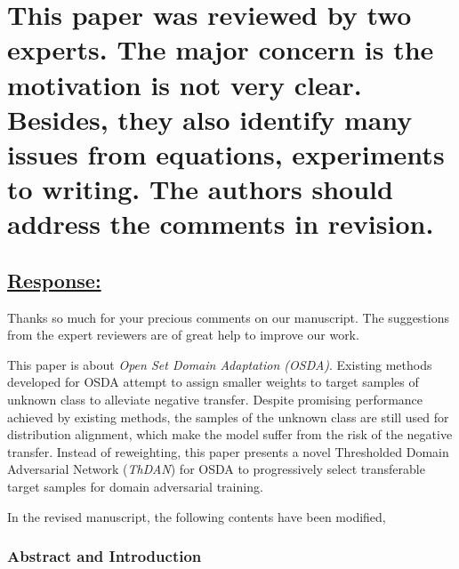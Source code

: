 \section*{This paper was reviewed by two experts.
    The major concern is the motivation is not very clear.
    Besides, they also identify many issues from equations, experiments to writing.
    The authors should address the comments in revision.
}
\subsection*{\underline{\textbf{Response:}}}

Thanks so much for your precious comments on our manuscript.
The suggestions from the expert reviewers are of great help to improve our work.

This paper is about \textit{Open Set Domain Adaptation (OSDA)}. 
Existing methods developed for OSDA attempt to assign smaller weights to target samples of unknown class to alleviate negative transfer.
Despite promising performance achieved by existing methods, the samples of the unknown class are still used for distribution alignment, which make the model suffer from the risk of the negative transfer. 
Instead of reweighting, this paper presents a novel Thresholded Domain Adversarial Network (\textit{ThDAN}) for OSDA to progressively select transferable target samples for domain adversarial training.

In the revised manuscript, the following contents have been modified,

\subsubsection*{{\textbf{Abstract and Introduction}}}

